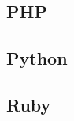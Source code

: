 \documentclass{KodeBook}
\begin{document}

\subsection{PHP}


\subsection{Python}


\subsection{Ruby}


\begin{discussion}
\end{discussion}

\ifx\wholebook\relax\else
% 
% 
	
\end{document}
